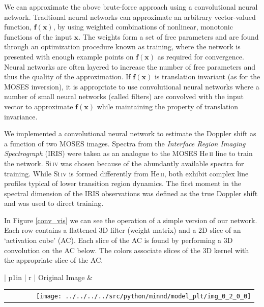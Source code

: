 \documentclass[landscape,paperwidth=46truein,paperheight=41truein,fontscale=0.3]{baposter}
\begin{document}
\begin{poster}
{\begin{center}
\begin{minipage}{0.98 \columnwidth}
\begin{multicols}{3}
				\hspace{8pt} We can approximate the above brute-force approach using a convolutional neural network. Tradtional neural networks can approximate an arbitrary vector-valued function, $\mathbf{f(\mathbf{x})}$, by using weighted combinations of nonlinear, monotonic functions of the input $\mathbf{x}$. %
				 The weights form a set of free parameters and are found through an optimization procedure known as training, where the network is presented with enough example points on $\mathbf{f}(\mathbf{x})$ as required for convergence. Neural networks are often layered to increase the number of free parameters and thus the quality of the approximation. If $\mathbf{f}(\mathbf{x})$ is translation invariant (as for the MOSES inversion), it is appropriate to use convolutional neural networks where a number of small neural networks (called filters) are convolved with the input vector to approximate $\mathbf{f}(\mathbf{x})$ while maintaining the property of translation invariance.
				
				\hspace{8pt} We implemented a convolutional neural network to estimate the Doppler shift as a function of two MOSES images. %
				  Spectra from the \textit{Interface Region Imaging Spectrograph} (IRIS) were taken as an analogue to the MOSES He\,\textsc{ii} line to train the network. Si\,\textsc{iv} was chosen because of the abundantly available spectra for training. While Si\,\textsc{iv} is formed differently from He\,\textsc{ii}, both exhibit complex line profiles typical of lower transition region dynamics. The first moment in the spectral dimension of the IRIS observations was defined as the true Doppler shift and was used to direct training.
				
				\hspace{8pt} In Figure \ref{conv_vis} we can see the operation of a simple version of our network.  Each row contains a flattened 3D filter (weight matrix) and a 2D slice of an `activation cube' (AC). Each slice of the AC is found by performing a 3D convolution on the AC below. The colors associate slices of the 3D kernel with the appropriate slice of the AC.
			

			\begin{center}
			\setlength{\tabcolsep}{.1em} %
			{\renewcommand{\arraystretch}{0.5}%
			\begin{tabular}{| p{1in} | r |} \hline
				 Original Image
				 &
				\begin{tabular}{c c c c | c}
					& & & & \texttt{[image: ../../../../src/python/minnd/model\_plt/img\_0\_2\_0\_0]}
				\end{tabular} \\ \hline
				 

\end{tabular}}
\end{center}
\end{multicols}
\end{minipage}
\end{center}}
\end{poster}
\end{document}
